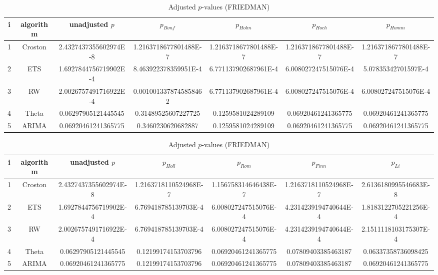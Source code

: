 \documentclass[a4paper,10pt]{article}
\begin{document}
\begin{landscape}
\begin{table}[!htp]
\centering\scriptsize
\caption{Adjusted $p$-values (FRIEDMAN)}
\begin{tabular}{ccccccc}
i&algorithm&unadjusted $p$&$p_{Bonf}$&$p_{Holm}$&$p_{Hoch}$&$p_{Homm}$\\
\hline
1&Croston&2.4327437355602974E-8&1.2163718677801488E-7&1.2163718677801488E-7&1.2163718677801488E-7&1.2163718677801488E-7\\
2&ETS&1.6927844756719902E-4&8.463922378359951E-4&6.771137902687961E-4&6.008027247515076E-4&5.07835342701597E-4\\
3&RW&2.0026757491716922E-4&0.0010013378745858462&6.771137902687961E-4&6.008027247515076E-4&6.008027247515076E-4\\
4&Theta&0.06297905121445545&0.31489525607227725&0.1259581024289109&0.06920461241365775&0.06920461241365775\\
5&ARIMA&0.06920461241365775&0.3460230620682887&0.1259581024289109&0.06920461241365775&0.06920461241365775\\
\hline
\end{tabular}
\end{table}

\begin{table}[!htp]
\centering\scriptsize
\caption{Adjusted $p$-values (FRIEDMAN)}
\begin{tabular}{ccccccc}
i&algorithm&unadjusted $p$&$p_{Holl}$&$p_{Rom}$&$p_{Finn}$&$p_{Li}$\\
\hline
1&Croston&2.4327437355602974E-8&1.2163718110524968E-7&1.156758314646438E-7&1.2163718110524968E-7&2.6136180995546683E-8\\
2&ETS&1.6927844756719902E-4&6.769418785139703E-4&6.008027247515076E-4&4.2314239194740644E-4&1.8183122705221256E-4\\
3&RW&2.0026757491716922E-4&6.769418785139703E-4&6.008027247515076E-4&4.2314239194740644E-4&2.1511118103175307E-4\\
4&Theta&0.06297905121445545&0.12199174153703796&0.06920461241365775&0.07809403385463187&0.06337358736098425\\
5&ARIMA&0.06920461241365775&0.12199174153703796&0.06920461241365775&0.07809403385463187&0.06920461241365775\\
\hline
\end{tabular}
\end{table}


\newpage


\end{landscape}
\end{document}
